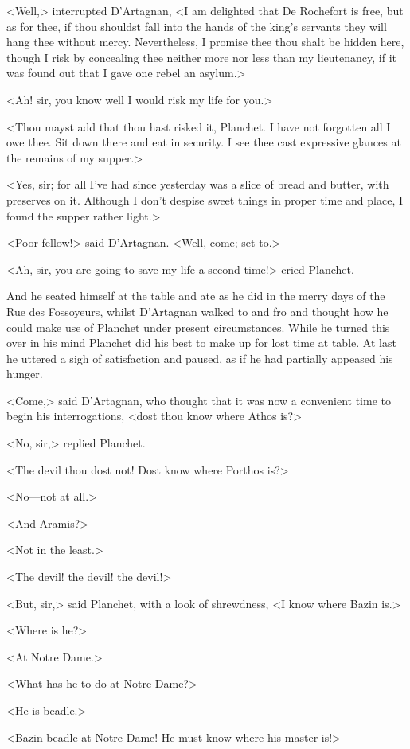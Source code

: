 <Well,> interrupted D'Artagnan, <I am delighted that De Rochefort is free, but as for thee, if thou shouldst fall into the hands of the king's servants they will hang thee without mercy. Nevertheless, I promise thee thou shalt be hidden here, though I risk by concealing thee neither more nor less than my lieutenancy, if it was found out that I gave one rebel an asylum.>

<Ah! sir, you know well I would risk my life for you.>

<Thou mayst add that thou hast risked it, Planchet. I have not forgotten all I owe thee. Sit down there and eat in security. I see thee cast expressive glances at the remains of my supper.>

<Yes, sir; for all I've had since yesterday was a slice of bread and butter, with preserves on it. Although I don't despise sweet things in proper time and place, I found the supper rather light.>

<Poor fellow!> said D'Artagnan. <Well, come; set to.>

<Ah, sir, you are going to save my life a second time!> cried Planchet.

And he seated himself at the table and ate as he did in the merry days of the Rue des Fossoyeurs, whilst D'Artagnan walked to and fro and thought how he could make use of Planchet under present circumstances. While he turned this over in his mind Planchet did his best to make up for lost time at table. At last he uttered a sigh of satisfaction and paused, as if he had partially appeased his hunger.

<Come,> said D'Artagnan, who thought that it was now a convenient time to begin his interrogations, <dost thou know where Athos is?>

<No, sir,> replied Planchet.

<The devil thou dost not! Dost know where Porthos is?>

<No—not at all.>

<And Aramis?>

<Not in the least.>

<The devil! the devil! the devil!>

<But, sir,> said Planchet, with a look of shrewdness, <I know where Bazin is.>

<Where is he?>

<At Notre Dame.>

<What has he to do at Notre Dame?>

<He is beadle.>

<Bazin beadle at Notre Dame! He must know where his master is!>

